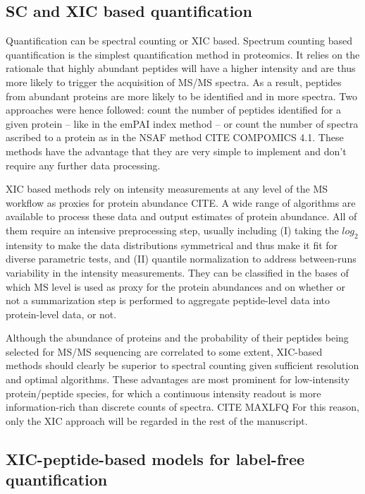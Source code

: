 \documentclass[11pt, a4paper]{report}
\begin{document}
\subsection{SC and XIC based quantification}
\label{subsec:scvsxic}


Quantification can be spectral counting or \ac{XIC} based.
Spectrum counting based quantification is the simplest quantification method in proteomics. It relies on the rationale that highly abundant peptides will have a higher intensity and are thus more likely to trigger the acquisition of MS/MS spectra. As a result, peptides from abundant proteins are more likely to be
identified and in more spectra. Two approaches were hence followed: count the number of peptides identified for a given protein – like in the emPAI index method – or count the number of spectra ascribed to a protein as in the NSAF method CITE COMPOMICS 4.1. These methods have the advantage that they are very simple to implement and don't require any further data processing.

\ac{XIC} based methods rely on intensity measurements at any level of the \ac{MS} workflow as proxies for protein abundance CITE. A wide range of algorithms are available to process these data and output estimates of protein abundance. All of them require an intensive preprocessing step, usually including (I) taking the $log_2$ intensity to make the data distributions symmetrical and thus make it fit for diverse parametric tests, and (II) quantile normalization to address between-runs variability in the intensity measurements. They can be classified in the bases of which MS level is used as proxy for the protein abundances and on whether or not a summarization step is performed to aggregate peptide-level data into protein-level data, or not. 


Although the abundance of proteins and the probability of their peptides being selected for \ac{MS/MS} sequencing are correlated to some extent, \ac{XIC}-based methods should clearly be superior to spectral counting given sufficient resolution and optimal algorithms. These advantages are most prominent for low-intensity protein/peptide species, for which a continuous intensity readout is more information-rich than discrete counts of spectra. CITE MAXLFQ For this reason, only the \ac{XIC} approach will be regarded in the rest of the manuscript.  


\subsection{\ac{XIC}-peptide-based models for label-free quantification}
\label{subsec:peptide_model}
\end{document}
